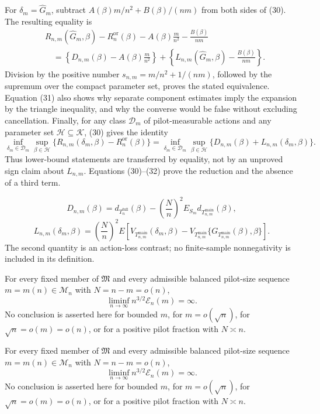 For \(\delta_m=\widehat G_m\), subtract
\(A(\beta)m/n^2+B(\beta)/(nm)\) from both sides of (30).  The resulting equality is
\[
\begin{aligned}
&R_{n,m}(\widehat G_m,\beta)-R_n^{\mathrm{or}}(\beta)
-A(\beta)\frac m{n^2}-\frac{B(\beta)}{nm}\\
&\quad=
\left\{D_{n,m}(\beta)-A(\beta)\frac m{n^2}\right\}
+\left\{L_{n,m}(\widehat G_m,\beta)-\frac{B(\beta)}{nm}\right\}.
\end{aligned}
\tag{31}
\]
Division by the positive number
\(s_{n,m}=m/n^2+1/(nm)\), followed by the supremum over the compact parameter set, proves the stated equivalence.  Equation (31) also shows why separate component estimates imply the expansion by the triangle inequality, and why the converse would be false without excluding cancellation.  Finally, for any class \(\mathcal D_m\) of pilot-measurable actions and any parameter set \(\mathcal H\subseteq\mathcal K\), (30) gives the identity
\[
\inf_{\delta_m\in\mathcal D_m}\sup_{\beta\in\mathcal H}
\{R_{n,m}(\delta_m,\beta)-R_n^{\mathrm{or}}(\beta)\}
=
\inf_{\delta_m\in\mathcal D_m}\sup_{\beta\in\mathcal H}
\{D_{n,m}(\beta)+L_{n,m}(\delta_m,\beta)\}.
\tag{32}
\]
Thus lower-bound statements are transferred by equality, not by an unproved sign claim about \(L_{n,m}\).  Equations (30)--(32) prove the reduction and the absence of a third term.

\[
D_{n,m}(\beta)
=d_{T_n^{\mathrm{full}}}(\beta)
-\left(\frac Nn\right)^2
E_{S_m}d_{T_{n,m}^{\mathrm{main}}}(\beta),
\]
\[
L_{n,m}(\delta_m,\beta)
=\left(\frac Nn\right)^2
E\!\left[
V_{T_{n,m}^{\mathrm{main}}}(\delta_m,\beta)
-V_{T_{n,m}^{\mathrm{main}}}
\{G_{T_{n,m}^{\mathrm{main}}}(\beta),\beta\}
\right].
\]
The second quantity is an action-loss contrast; no finite-sample nonnegativity is included in its definition.

For every fixed member of \(\mathfrak M\) and every admissible balanced pilot-size sequence \(m=m(n)\in\mathcal M_n\) with \(N=n-m=o(n)\),
\[
\liminf_{n\to\infty}n^{3/2}\mathcal E_n(m)=\infty.
\]
No conclusion is asserted here for bounded \(m\), for \(m=o(\sqrt n)\), for \(\sqrt n=o(m)=o(n)\), or for a positive pilot fraction with \(N\asymp n\).

For every fixed member of \(\mathfrak M\) and every admissible balanced pilot-size sequence \(m=m(n)\in\mathcal M_n\) with \(N=n-m=o(n)\),
\[
\liminf_{n\to\infty}n^{3/2}\mathcal E_n(m)=\infty.
\]
No conclusion is asserted here for bounded \(m\), for \(m=o(\sqrt n)\), for \(\sqrt n=o(m)=o(n)\), or for a positive pilot fraction with \(N\asymp n\).

